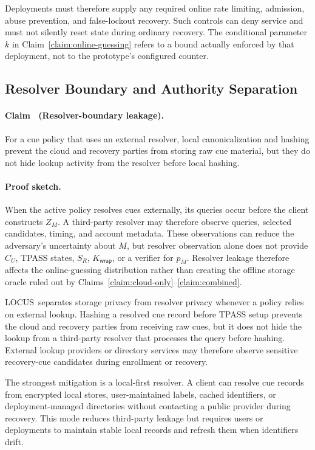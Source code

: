 \documentclass[sigconf,anonymous]{acmart}
\newcommand{\LOCUS}{\textsf{LOCUS}}
\newcounter{locusclaim}
\newcommand{\locusclaim}[1]{\refstepcounter{locusclaim}\paragraph{Claim \thelocusclaim\ (#1).}}
\newcommand{\proofsketch}{\paragraph{Proof sketch.}}
\begin{document}
Deployments must therefore supply any required online rate limiting, admission, abuse prevention, and false-lockout recovery. Such controls can deny service and must not silently reset state during ordinary recovery. The conditional parameter \(k\) in Claim~\ref{claim:online-guessing} refers to a bound actually enforced by that deployment, not to the prototype's configured counter.

\subsection{Resolver Boundary and Authority Separation}
\label{subsec:resolver-privacy}

\locusclaim{Resolver-boundary leakage}
\label{claim:resolver-boundary}
For a cue policy that uses an external resolver, local canonicalization and hashing prevent the cloud and recovery parties from storing raw cue material, but they do not hide lookup activity from the resolver before local hashing.

\proofsketch
When the active policy resolves cues externally, its queries occur before the client constructs \(Z_M\). A third-party resolver may therefore observe queries, selected candidates, timing, and account metadata. These observations can reduce the adversary's uncertainty about \(M\), but resolver observation alone does not provide \(C_U\), TPASS states, \(S_R\), \(K_{\mathsf{wrap}}\), or a verifier for \(p_M\). Resolver leakage therefore affects the online-guessing distribution rather than creating the offline storage oracle ruled out by Claims~\ref{claim:cloud-only}--\ref{claim:combined}.

\LOCUS\ separates storage privacy from resolver privacy whenever a policy relies on external lookup. Hashing a resolved cue record before TPASS setup prevents the cloud and recovery parties from receiving raw cues, but it does not hide the lookup from a third-party resolver that processes the query before hashing. External lookup providers or directory services may therefore observe sensitive recovery-cue candidates during enrollment or recovery.

The strongest mitigation is a local-first resolver. A client can resolve cue records from encrypted local stores, user-maintained labels, cached identifiers, or deployment-managed directories without contacting a public provider during recovery. This mode reduces third-party leakage but requires users or deployments to maintain stable local records and refresh them when identifiers drift.
\end{document}
